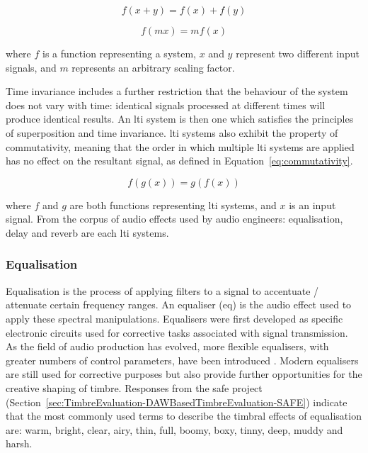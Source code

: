 		\begin{equation} f(x + y) = f(x) + f(y) \label{eq:additivity} \end{equation}

		\begin{equation} f(mx) = mf(x) \label{eq:homogeneity} \end{equation}

		where $f$ is a function representing a system, $x$ and $y$ represent two different input signals, and
		$m$ represents an arbitrary scaling factor.

		Time invariance includes a further restriction that the behaviour of the system does not vary with time:
		identical signals processed at different times will produce identical results. An \acrshort{lti} system is
		then one which satisfies the principles of superposition and time invariance. \acrshort{lti} systems also
		exhibit the property of commutativity, meaning that the order in which multiple \acrshort{lti} systems are
		applied has no effect on the resultant signal, as defined in Equation~\ref{eq:commutativity}.

		\begin{equation} f(g(x)) = g(f(x)) \label{eq:commutativity} \end{equation}

		where $f$ and $g$ are both functions representing \acrshort{lti} systems, and $x$ is an input signal.  From
		the corpus of audio effects used by audio engineers: equalisation, delay and reverb are each \acrshort{lti}
		systems.

		\subsubsection*{Equalisation}
			Equalisation is the process of applying filters to a signal to accentuate / attenuate certain
			frequency ranges. An equaliser (\acrshort{eq}) is the audio effect used to apply these spectral
			manipulations.  Equalisers were first developed as specific electronic circuits used for corrective
			tasks associated with signal transmission. As the field of audio production has evolved, more
			flexible equalisers, with greater numbers of control parameters, have been introduced
			\citep{gottlieb2007shaping}. Modern equalisers are still used for corrective purposes but also
			provide further opportunities for the creative shaping of timbre. Responses from the
			\acrshort{safe} project (Section~\ref{sec:TimbreEvaluation-DAWBasedTimbreEvaluation-SAFE}) indicate
			that the most commonly used terms to describe the timbral effects of equalisation are: warm,
			bright, clear, airy, thin, full, boomy, boxy, tinny, deep, muddy and harsh.

